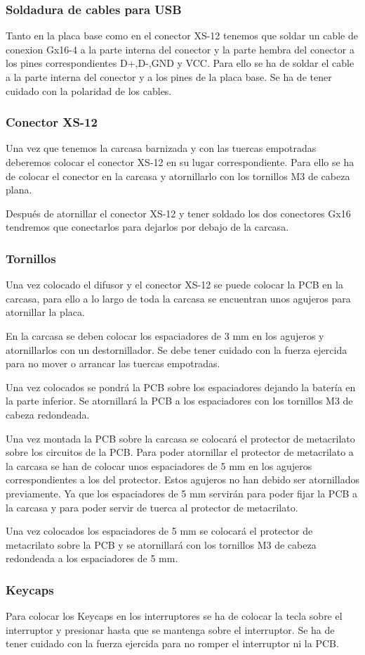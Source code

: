 \subsubsection{Soldadura de cables para \gls{USB}}
Tanto en la placa base como en el conector XS-12 tenemos que soldar un cable de conexion Gx16-4 a la parte interna del conector y la parte hembra del conector a los pines correspondientes D+,D-,GND y VCC. Para ello se ha de soldar el cable a la parte interna del conector y a los pines de la placa base. Se ha de tener cuidado con la polaridad de los cables.

\subsubsection{Conector XS-12}
Una vez que tenemos la carcasa barnizada y con las tuercas empotradas deberemos colocar el conector XS-12 en su lugar correspondiente. Para ello se ha de colocar el conector en la carcasa y atornillarlo con los tornillos M3 de cabeza plana.

Después de atornillar el conector XS-12 y tener soldado los dos conectores Gx16 tendremos que conectarlos para dejarlos por debajo de la carcasa.

\subsubsection{Tornillos}
Una vez colocado el difusor y el conector XS-12 se puede colocar la \gls{PCB} en la carcasa, para ello a lo largo de toda la carcasa se encuentran unos agujeros para atornillar la placa.

En la carcasa se deben colocar los espaciadores de 3 mm en los agujeros y atornillarlos con un destornillador. Se debe tener cuidado con la fuerza ejercida para no mover o arrancar las tuercas empotradas.

Una vez colocados se pondrá la \gls{PCB} sobre los espaciadores dejando la batería en la parte inferior. Se atornillará la \gls{PCB} a los espaciadores con los tornillos M3 de cabeza redondeada.

Una vez montada la \gls{PCB} sobre la carcasa se colocará el protector de metacrilato sobre los circuitos de la \gls{PCB}. Para poder atornillar el protector de metacrilato a la carcasa se han de colocar unos espaciadores de 5 mm en los agujeros correspondientes a los del protector. Estos agujeros no han debido ser atornillados previamente. Ya que los espaciadores de 5 mm servirán para poder fijar la \gls{PCB} a la carcasa y para poder servir de tuerca al protector de metacrilato.

Una vez colocados los espaciadores de 5 mm se colocará el protector de metacrilato sobre la \gls{PCB} y se atornillará con los tornillos M3 de cabeza redondeada a los espaciadores de 5 mm.

\subsubsection{\gls{Keycaps}}
Para colocar los \gls{Keycaps} en los interruptores se ha de colocar la tecla sobre el interruptor y presionar hasta que se mantenga sobre el interruptor. Se ha de tener cuidado con la fuerza ejercida para no romper el interruptor ni la \gls{PCB}.